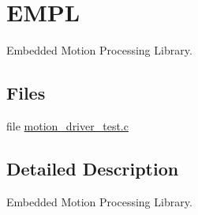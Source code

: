 \hypertarget{group__e_m_p_l}{}\section{E\+M\+PL}
\label{group__e_m_p_l}


Embedded Motion Processing Library.  


\subsection*{Files}
\begin{DoxyCompactItemize}
\item 
file \hyperlink{motion__driver__test_8c}{motion\+\_\+driver\+\_\+test.\+c}
\end{DoxyCompactItemize}


\subsection{Detailed Description}
Embedded Motion Processing Library. 

